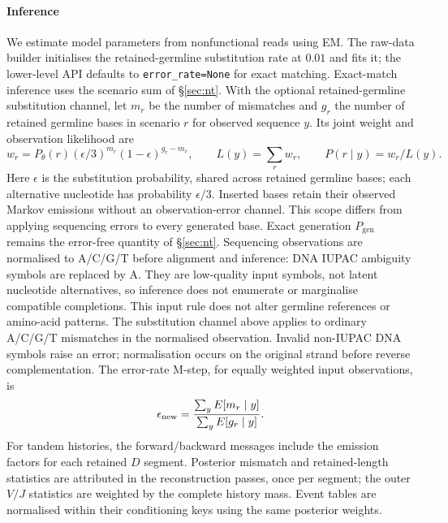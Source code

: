 \documentclass[11pt]{article}
\theoremstyle{oldplain}
\theoremstyle{oldrem}
\newcommand{\Pgen}{P_{\mathrm{gen}}}
\begin{document}
\paragraph{Inference} We estimate model parameters from nonfunctional reads using EM.
The raw-data builder initialises the retained-germline substitution rate at
$0.01$ and fits it; the lower-level  API defaults to
\texttt{error\_rate=None} for exact matching. Exact-match inference uses the scenario sum of
\S\ref{sec:nt}. With the optional retained-germline substitution channel, let
$m_r$ be the number of mismatches and $g_r$ the number of retained germline bases
in scenario $r$ for observed sequence $y$. Its joint weight and observation likelihood are
\begin{equation}
 w_r=P_\theta(r)(\epsilon/3)^{m_r}(1-\epsilon)^{g_r-m_r},\qquad
 L(y)=\sum_r w_r,\qquad P(r\mid y)=w_r/L(y).
\end{equation}
Here $\epsilon$ is the substitution probability, shared across retained germline
bases; each alternative nucleotide has probability $\epsilon/3$. Inserted bases
retain their observed Markov emissions without an observation-error channel.
This scope differs from applying sequencing errors to every generated base.
Exact generation $\Pgen$ remains the error-free quantity of \S\ref{sec:nt}.
Sequencing observations are normalised to A/C/G/T before alignment and inference:
DNA IUPAC ambiguity symbols are replaced by A. They are low-quality input symbols,
not latent nucleotide alternatives, so inference does not enumerate or marginalise
compatible completions. This input rule does not alter germline references or
amino-acid patterns. The substitution channel above applies to ordinary A/C/G/T
mismatches in the normalised observation.
Invalid non-IUPAC DNA symbols raise an error; normalisation occurs on the original
strand before reverse complementation.
The error-rate M-step, for equally weighted input observations, is
\begin{equation}
 \epsilon_{\rm new}=
 \frac{\sum_y E[m_r\mid y]}{\sum_y E[g_r\mid y]}.
\end{equation}
For tandem histories, the forward/backward messages include the emission factors
for each retained $D$ segment. Posterior mismatch and retained-length statistics
are attributed in the reconstruction passes, once per segment; the outer $V/J$
statistics are weighted by the complete history mass. Event tables are normalised
within their conditioning keys using the same posterior weights.
\end{document}
